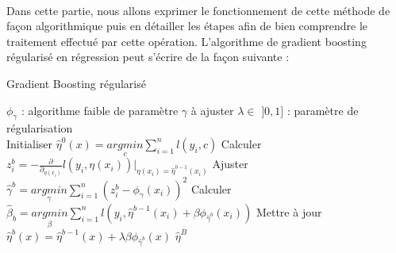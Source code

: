 \documentclass[14pt, openany]{article}
\begin{document}
\paragraph{}
Dans cette partie, nous allons exprimer le fonctionnement de cette méthode de façon algorithmique puis en détailler les étapes afin de bien comprendre le traitement effectué par cette opération. L'algorithme de gradient boosting régularisé en régression peut s'écrire de la façon suivante :
\begin{algorithm}
\caption{Gradient Boosting régularisé}
\begin{algorithmic}
\REQUIRE 
\STATE $\phi_{\gamma}$ : algorithme faible de paramètre $\gamma$ à ajuster
\STATE $\lambda \in $ $]0,1]$ : paramètre de régularisation\\
\ENSURE
\STATE Initialiser $\hat{\eta}^0(x)=\underset{c}{argmin}\sum\limits_{i=1}^n l(y_i,c)$
\STATE Calculer $z_{i}^b=-\frac{\partial}{\partial_{\eta(x_i)}}l(y_i,\eta(x_i))\vert_{\eta(x_i)=\hat{\eta}^{b-1}(x_i)}$
\STATE Ajuster $\hat{\gamma}^b=\underset{\gamma}{argmin}\sum\limits_{i=1}^n(z_{i}^b-\phi_{\gamma}(x_i))^2$
\STATE Calculer $\hat{\beta}_b=\underset{\beta}{argmin}\sum\limits_{i=1}^n l(y_i,\hat{\eta}^{b-1}(x_i)+\beta\phi_{\hat{\gamma}^b}(x_i))$
\STATE Mettre à jour $\hat{\eta}^b(x)=\hat{\eta}^{b-1}(x)+\lambda\beta\phi_{\hat{\gamma}^b}(x)$
\ENDFOR
\RETURN $\hat{\eta}^B$
\PRINT
\end{algorithmic}
\end{algorithm}
\end{document}
